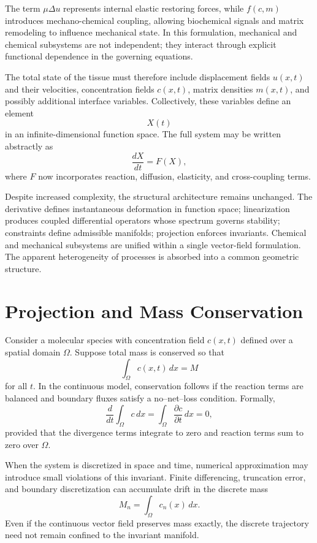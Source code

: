 \documentclass[12pt]{book}
\begin{document}
The term $\mu \Delta u$ represents internal elastic restoring forces,
while $f(c,m)$ introduces mechano-chemical coupling, allowing
biochemical signals and matrix remodeling to influence mechanical
state. In this formulation, mechanical and chemical subsystems are
not independent; they interact through explicit functional dependence
in the governing equations.

The total state of the tissue must therefore include displacement
fields $u(x,t)$ and their velocities, concentration fields $c(x,t)$,
matrix densities $m(x,t)$, and possibly additional interface
variables. Collectively, these variables define an element
\[
X(t)
\]
in an infinite-dimensional function space. The full system may be
written abstractly as
\[
\frac{dX}{dt} = F(X),
\]
where $F$ now incorporates reaction, diffusion, elasticity, and
cross-coupling terms.

Despite increased complexity, the structural architecture remains
unchanged. The derivative defines instantaneous deformation in
function space; linearization produces coupled differential
operators whose spectrum governs stability; constraints define
admissible manifolds; projection enforces invariants. Chemical and
mechanical subsystems are unified within a single vector-field
formulation. The apparent heterogeneity of processes is absorbed into
a common geometric structure.

\section{Projection and Mass Conservation}

Consider a molecular species with concentration field $c(x,t)$ defined
over a spatial domain $\Omega$. Suppose total mass is conserved so that
\[
\int_\Omega c(x,t)\, dx = M
\]
for all $t$. In the continuous model, conservation follows if the
reaction terms are balanced and boundary fluxes satisfy a no–net–loss
condition. Formally,
\[
\frac{d}{dt} \int_\Omega c\, dx
=
\int_\Omega \frac{\partial c}{\partial t}\, dx
=
0,
\]
provided that the divergence terms integrate to zero and reaction
terms sum to zero over $\Omega$.

When the system is discretized in space and time, numerical
approximation may introduce small violations of this invariant.
Finite differencing, truncation error, and boundary discretization
can accumulate drift in the discrete mass
\[
M_n = \int_\Omega c_n(x)\, dx.
\]
Even if the continuous vector field preserves mass exactly, the
discrete trajectory need not remain confined to the invariant
manifold.
\end{document}
